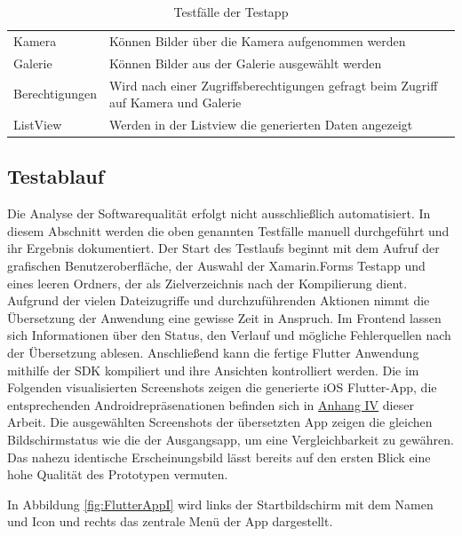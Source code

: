 \begin{table}[!ht]
\begin{tabularx}{\textwidth}{|l|X|}
Kamera			         				& Können Bilder über die Kamera aufgenommen werden\\ 
Galerie			         				& Können Bilder aus der Galerie ausgewählt werden                			 \\ 
Berechtigungen			         	& Wird nach einer Zugriffsberechtigungen gefragt beim Zugriff auf Kamera und Galerie \\ 
ListView					         	& Werden in der Listview die generierten Daten angezeigt                   			 \\ 
\hline
\end{tabularx}
	  \caption{Testfälle der Testapp}
 \label{tab:Testapp}
\end{table}

\subsection{Testablauf}
Die Analyse der Softwarequalität erfolgt nicht ausschließlich automatisiert.  In diesem Abschnitt werden die oben genannten Testfälle manuell durchgeführt und ihr Ergebnis dokumentiert.
Der Start  des Testlaufs beginnt mit dem Aufruf der grafischen Benutzeroberfläche,   der Auswahl der Xamarin.Forms Testapp und eines leeren Ordners, der als Zielverzeichnis nach der Kompilierung dient. 
Aufgrund der vielen Dateizugriffe und durchzuführenden Aktionen nimmt die Übersetzung der Anwendung eine gewisse Zeit in Anspruch. Im Frontend lassen sich Informationen über den Status, den Verlauf und mögliche Fehlerquellen nach der Übersetzung ablesen.  Anschließend kann die fertige Flutter Anwendung mithilfe der SDK kompiliert und ihre Ansichten kontrolliert werden.  Die im Folgenden visualisierten Screenshots zeigen die generierte iOS Flutter-App,  die entsprechenden Androidrepräsenationen befinden sich in  \hyperref[chap:AnhangAndroidScreenshotsFlutter]{Anhang IV} dieser Arbeit.  Die ausgewählten Screenshots der übersetzten App zeigen die gleichen Bildschirmstatus  wie die der Ausgangsapp, um eine Vergleichbarkeit zu gewähren.  Das nahezu identische Erscheinungsbild lässt bereits auf den ersten Blick eine hohe Qualität des Prototypen vermuten.  

In Abbildung \ref{fig:FlutterAppI} wird links der Startbildschirm mit dem Namen und Icon und rechts das zentrale Menü der App dargestellt. 


